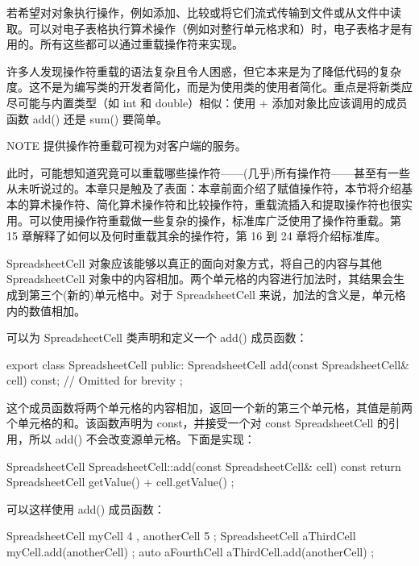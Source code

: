 
若希望对对象执行操作，例如添加、比较或将它们流式传输到文件或从文件中读取。可以对电子表格执行算术操作（例如对整行单元格求和）时，电子表格才是有用的。所有这些都可以通过重载操作符来实现。

许多人发现操作符重载的语法复杂且令人困惑，但它本来是为了降低代码的复杂度。这不是为编写类的开发者简化，而是为使用类的使用者简化。重点是将新类应尽可能与内置类型（如 int 和 double）相似：使用 + 添加对象比应该调用的成员函数 add() 还是 sum() 要简单。

\begin{myNotic}{NOTE}
提供操作符重载可视为对客户端的服务。
\end{myNotic}

此时，可能想知道究竟可以重载哪些操作符——(几乎)所有操作符——甚至有一些从未听说过的。本章只是触及了表面：本章前面介绍了赋值操作符，本节将介绍基本的算术操作符、简化算术操作符和比较操作符，重载流插入和提取操作符也很实用。可以使用操作符重载做一些复杂的操作，标准库广泛使用了操作符重载。第 15 章解释了如何以及何时重载其余的操作符，第 16 到 24 章将介绍标准库。


SpreadsheetCell 对象应该能够以真正的面向对象方式，将自己的内容与其他 SpreadsheetCell 对象中的内容相加。两个单元格的内容进行加法时，其结果会生成到第三个(新的)单元格中。对于 SpreadsheetCell 来说，加法的含义是，单元格内的数值相加。


可以为 SpreadsheetCell 类声明和定义一个 add() 成员函数：

\begin{cpp}
export class SpreadsheetCell
{
    public:
        SpreadsheetCell add(const SpreadsheetCell& cell) const;
        // Omitted for brevity
};
\end{cpp}

这个成员函数将两个单元格的内容相加，返回一个新的第三个单元格，其值是前两个单元格的和。该函数声明为 const，并接受一个对 const SpreadsheetCell 的引用，所以 add() 不会改变源单元格。下面是实现：

\begin{cpp}
SpreadsheetCell SpreadsheetCell::add(const SpreadsheetCell& cell) const
{
    return SpreadsheetCell { getValue() + cell.getValue() };
}
\end{cpp}

可以这样使用 add() 成员函数：

\begin{cpp}
SpreadsheetCell myCell { 4 }, anotherCell { 5 };
SpreadsheetCell aThirdCell { myCell.add(anotherCell) };
auto aFourthCell { aThirdCell.add(anotherCell) };
\end{cpp}

